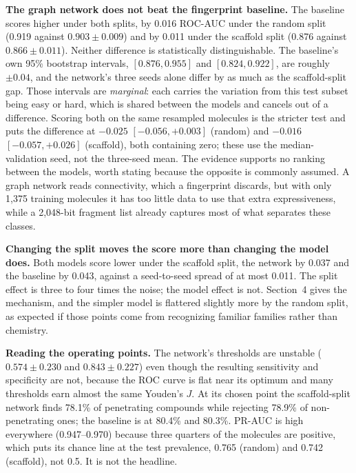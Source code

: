 \documentclass[11pt,a4paper]{article}
\begin{document}
\begin{table}[t]
\centering\footnotesize\setlength{\tabcolsep}{3pt}
\caption{\textbf{Test results for both models under both splits.} Thresholds were fixed on the matching
validation subset by maximizing Youden's $J$ \cite{youden1950}, which is sensitivity plus specificity
minus one, and never adjusted afterwards. GNN rows are mean $\pm$ SD over
three seeds; fingerprint rows are a single deterministic fit. Acc.\ = accuracy, Sens.\ = sensitivity,
Spec.\ = specificity. $n = 294$ test molecules (random), 295 (scaffold).}
\label{tab:comparison}

\end{table}

\textbf{The graph network does not beat the fingerprint baseline.} The baseline scores higher under both
splits, by 0.016 ROC-AUC under the random split (0.919 against $0.903 \pm 0.009$) and by 0.011 under the
scaffold split (0.876 against $0.866 \pm 0.011$). Neither difference is statistically distinguishable.
The baseline's own 95\% bootstrap intervals, $[0.876, 0.955]$ and $[0.824, 0.922]$, are roughly
$\pm 0.04$, and the network's three seeds alone differ by as much as the scaffold-split gap. Those
intervals are \emph{marginal}: each carries the variation from this test subset being easy or hard, which
is shared between the models and cancels out of a difference. Scoring both on the same resampled
molecules is the stricter test and puts the difference at $-0.025$ $[-0.056, +0.003]$ (random) and
$-0.016$ $[-0.057, +0.026]$ (scaffold), both containing zero; these use the median-validation seed, not
the three-seed mean. The evidence supports no ranking between the models, worth stating because the
opposite is commonly assumed. A graph network reads connectivity, which a fingerprint discards, but with
only 1,375 training molecules it has too little data to use that extra expressiveness, while a 2,048-bit
fragment list already captures most of what separates these classes.

\textbf{Changing the split moves the score more than changing the model does.} Both models score lower
under the scaffold split, the network by 0.037 and the baseline by 0.043, against a seed-to-seed spread
of at most 0.011. The split effect is three to four times the noise; the model effect is not. Section~4
gives the mechanism, and the simpler model is flattered slightly more by the random split, as expected if
those points come from recognizing familiar families rather than chemistry.

\textbf{Reading the operating points.} The network's thresholds are unstable ($0.574 \pm 0.230$ and
$0.843 \pm 0.227$) even though the resulting sensitivity and specificity are not, because the ROC curve
is flat near its optimum and many thresholds earn almost the same Youden's $J$. At its chosen point the
scaffold-split network finds 78.1\% of penetrating compounds while rejecting 78.9\% of non-penetrating
ones; the baseline is at 80.4\% and 80.3\%. PR-AUC is high everywhere (0.947--0.970) because three
quarters of the molecules are positive, which puts its chance line at the test prevalence, 0.765 (random)
and 0.742 (scaffold), not 0.5. It is not the headline.
\end{document}
